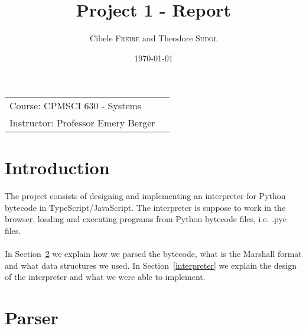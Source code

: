 \documentclass{article}
\title{Project 1 - Report} %
\author{Cibele \textsc{Freire} and Theodore \textsc{Sudol}} %
\date{\today} %
\begin{document}

\maketitle %

\begin{center}
\begin{tabular}{l r}
Course: CPMSCI 630 - Systems \\
Instructor: Professor Emery Berger %

\end{tabular}
\end{center}





\section{Introduction}\label{intro}

\paragraph{}
The project consists of designing and implementing an interpreter for Python bytecode in TypeScript/JavaScript. The interpreter is suppose to work in the browser, loading and executing programs from Python bytecode files, i.e. .pyc files.

\paragraph{}
In Section~\ref{parser} we explain how we parsed the bytecode, what is the Marshall format and what data structures we used. In Section~\ref{interpreter} we explain the design of the interpreter and what we were able to implement.

\section{Parser}\label{parser}
\end{document}
